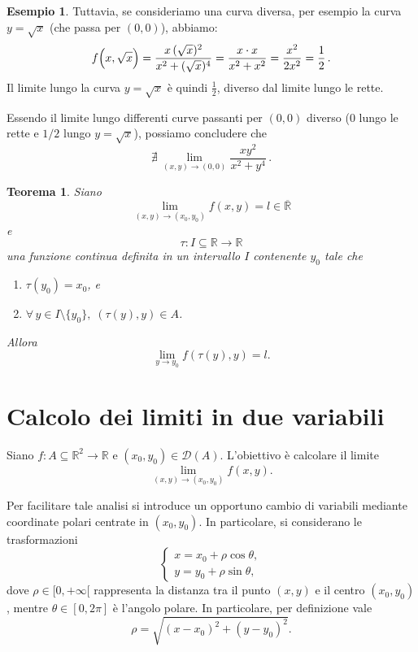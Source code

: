\documentclass{article}
\theoremstyle{plain}
\newtheorem{thm}{Teorema}[section]
\theoremstyle{definition}
\newtheorem{exmp}{Esempio}[section]
\theoremstyle{remark}
\begin{document}
\begin{exmp}
    Tuttavia, se consideriamo una curva diversa, per esempio la curva \(y=\sqrt{x}\) (che passa per \((0,0)\)), abbiamo:
    \[
    f\Bigl(x,\sqrt{x}\Bigr)=\frac{x\,( \sqrt{x})^2}{x^2+ (\sqrt{x})^4}
    =\frac{x\cdot x}{x^2+x^2}
    =\frac{x^2}{2x^2}=\frac{1}{2}\,.
    \]
    Il limite lungo la curva \(y=\sqrt{x}\) è quindi \(\frac{1}{2}\), diverso dal limite lungo le rette.

    Essendo il limite lungo differenti curve passanti per \((0,0)\) diverso (0 lungo le rette e \(1/2\) lungo \(y=\sqrt{x}\)), possiamo concludere che
    \[
    \nexists\,\lim_{(x,y)\to(0,0)} \frac{xy^2}{x^2+y^4}\,.
    \]
\end{exmp}

\vspace{10pt}

\begin{bxthm}
\begin{thm}
    Siano \[\lim_{(x,y)\to(x_0,y_0)}f(x,y)=l\in\overline{\mathbb{R}}\] e 
    \[\tau :I\subseteq\mathbb{R}\to\mathbb{R}\]
    una funzione continua definita in un intervallo $I$ contenente $y_0$ tale che 
    \begin{enumerate}
        \item $\tau(y_0)=x_0$, e 
        \item $\forall\, y\in I\setminus\{y_0\},\;(\tau(y),y)\in A$.
    \end{enumerate}
    Allora 
    \[\lim_{y\to y_0}f(\tau(y),y)=l.\]
\end{thm}
\end{bxthm}

\vspace{10pt}

\section{Calcolo dei limiti in due variabili}

\vspace{10pt}


Siano $f:A\subseteq\mathbb{R}^2\to\mathbb{R}$ e $(x_0,y_0)\in\mathcal{D}(A)$.
L'obiettivo è calcolare il limite
\[
\lim_{(x,y) \to (x_0,y_0)} f(x,y).
\]

Per facilitare tale analisi si introduce un opportuno cambio di variabili mediante coordinate polari centrate in \((x_0,y_0)\). In particolare, si considerano le trasformazioni
\[
\begin{cases}
x = x_0 + \rho\cos\theta, \\[1mm]
y = y_0 + \rho\sin\theta,
\end{cases}
\]
dove \(\rho\in[0,+\infty[\) rappresenta la distanza tra il punto \((x,y)\) e il centro \((x_0,y_0)\), mentre \(\theta\in[0,2\pi]\) è l'angolo polare. 
In particolare, per definizione vale
\[
\rho = \sqrt{(x-x_0)^2 + (y-y_0)^2}.
\]
\end{document}
